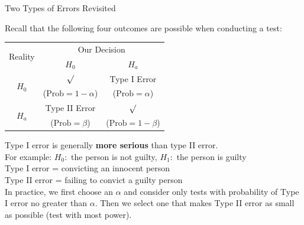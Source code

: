 \documentclass{beamer}\usepackage[]{graphicx}\usepackage[]{color}
\begin{document}
\begin{frame}{Two Types of Errors Revisited}

    Recall that the following four outcomes are possible when conducting
    a test:

    \begin{center}
      \begin{tabular}{|c|c|c|}
        \hline
        \multirow{2}{*}{Reality} & \multicolumn{2}{c|}{Our Decision}\\
        & \multicolumn{1}{c}{$H_0$} & $H_a$\\
        \hline
        \multirow{2}{*}{$H_0$} & $\surd$ & Type I Error\\
        & ($\mbox{Prob}=1-\alpha$) & ($\mbox{Prob}=\alpha$)\\
        \cline{2-3}
        \multirow{2}{*}{$H_a$} & Type II Error & $\surd$\\
        & ($\mbox{Prob}=\beta$) & ($\mbox{Prob}=1-\beta$)\\
        \hline
      \end{tabular}
    \end{center}
\pause
    Type I error is generally {\bf more serious} than type II error. \\ \pause
    For example: $H_0:$ the person is not guilty, $H_1:$ the person is guilty\\ \pause
    Type I error \pause = convicting an innocent person\\ \pause
    Type II error \pause = failing to convict a guilty person\\ \pause
    In practice, we first choose an $\alpha$ and consider only tests
    with probability of Type I error no greater than $\alpha$. \pause Then we select one that makes Type II error as small as possible (test with most power). \pause

\end{frame}
\end{document}
